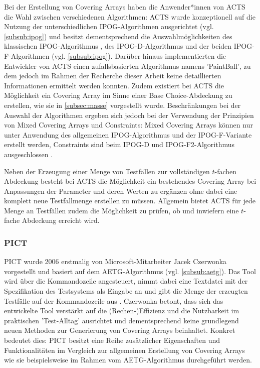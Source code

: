 Bei der Erstellung von Covering Arrays haben die Anwender*innen von ACTS die Wahl zwischen verschiedenen Algorithmen: ACTS wurde konzeptionell auf die Nutzung der unterschiedlichen IPOG-Algorithmen ausgerichtet (vgl. \autoref{subsub:ipog}) und besitzt dementsprechend die Auswahlmöglichkeiten des klassischen IPOG-Algorithmus \cite{lei2008ipog}, des IPOG-D-Algorithmus \cite{lei2008ipog} und der beiden IPOG-F-Algorithmen \cite{forbes2008refining} (vgl. \autoref{subsub:ipog}). Darüber hinaus implementierten die Entwickler von ACTS einen zufallsbasierten Algorithmus namens 'PaintBall', zu dem jedoch im Rahmen der Recherche dieser Arbeit keine detaillierten Informationen ermittelt werden konnten. Zudem existiert bei ACTS die Möglichkeit ein Covering Array im Sinne einer Base Choice-Abdeckung zu erstellen, wie sie in \autoref{subsec:masse} vorgestellt wurde. Beschränkungen bei der Auswahl der Algorithmen ergeben sich jedoch bei der Verwendung der Prinzipien von Mixed Covering Arrays und Constraints: Mixed Covering Arrays können nur unter Anwendung des allgemeinen IPOG-Algorithmus und der IPOG-F-Variante erstellt werden, Constraints sind beim IPOG-D und IPOG-F2-Algorithmus ausgeschlossen \cite{acts_user_guide}.

Neben der Erzeugung einer Menge von Testfällen zur vollständigen $t$-fachen Abdeckung besteht bei ACTS die Möglichkeit ein bestehendes Covering Array bei Anpassungen der Parameter und deren Werten zu ergänzen ohne dabei eine komplett neue Testfallmenge erstellen zu müssen. Allgemein bietet ACTS für jede Menge an Testfällen zudem die Möglichkeit zu prüfen, ob und inwiefern eine $t$-fache Abdeckung erreicht wird.

\subsubsection{PICT}\label{subsub:pict}
PICT \cite{czerwonka2006pairwise, pict} wurde 2006 erstmalig von Microsoft-Mitarbeiter Jacek Czerwonka vorgestellt und basiert auf dem AETG-Algorithmus (vgl. \autoref{subsub:aetg}). Das Tool wird über die Kommandozeile angesteuert, nimmt dabei eine Textdatei mit der Spezifikation des Testsystems als Eingabe an und gibt die Menge der erzeugten Testfälle auf der Kommandozeile aus \cite{pict}. Czerwonka \cite{czerwonka2006pairwise} betont, dass sich das entwickelte Tool verstärkt auf die (Rechen-)Effizienz und die Nutzbarkeit im praktischen 'Test-Alltag' ausrichtet und dementsprechend keine grundlegend neuen Methoden zur Generierung von Covering Arrays beinhaltet. Konkret bedeutet dies: PICT besitzt eine Reihe zusätzlicher Eigenschaften und Funktionalitäten im Vergleich zur allgemeinen Erstellung von Covering Arrays wie sie beispielsweise im Rahmen vom AETG-Algorithmus durchgeführt werden.

